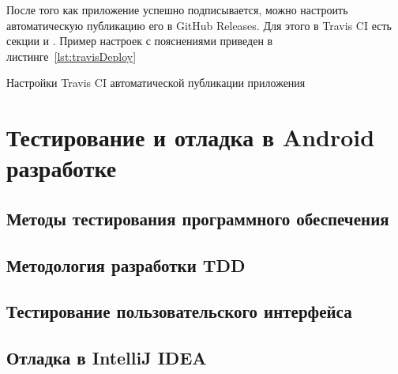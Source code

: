 После того как приложение успешно подписывается, можно настроить автоматическую публикацию его в GitHub Releases.
Для этого в Travis CI есть секции  и .
Пример настроек с пояснениями приведен в листинге~\ref{lst:travisDeploy}

\begin{listing}[h]
  \caption{Настройки Travis CI автоматической публикации приложения}
  \label{lst:travisDeploy}
\end{listing}

\section{Тестирование и отладка в Android разработке}
\label{sec:testing}

\subsection{Методы тестирования программного обеспечения}
\label{subsec:testing:methods}

\subsection{Методология разработки TDD}
\label{subsec:testing:tdd}

\subsection{Тестирование пользовательского интерфейса}
\label{subsec:testing:ui}

\subsection{Отладка в IntelliJ IDEA}
\label{subsec:debug}

\conclusions
\label{sec:techConclusions}
